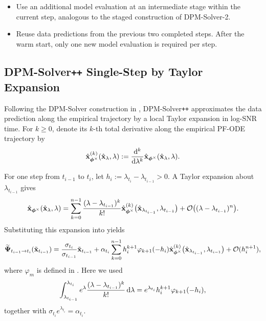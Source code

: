 \begin{itemize}
    \item {}
    Use an additional model evaluation at an intermediate stage within the
    current step, analogous to the staged construction of DPM-Solver-2.

    \item {}
    Reuse data predictions from the previous two completed steps. After the
    warm start, only one new model evaluation is required per step.
\end{itemize}


\subsection{DPM-Solver\texttt{++} Single-Step by Taylor Expansion}
\label{subsec:dpm-solver++-single}

Following the DPM-Solver construction in ,
DPM-Solver\texttt{++} approximates the data prediction along the empirical
trajectory by a local Taylor expansion in log-SNR time. For $k\geq0$, denote
its $k$-th total derivative along the empirical PF-ODE trajectory by
\[
\hat{{\mathbf{x}}}_{\bm{\phi}^\times}^{(k)}
(\hat{{\mathbf{x}}}_\lambda,\lambda)
:=
\frac{\mathop{}\!\mathrm{d}^k}{\mathop{}\!\mathrm{d}\lambda^k}
\hat{{\mathbf{x}}}_{\bm{\phi}^\times}
(\hat{{\mathbf{x}}}_\lambda,\lambda).
\]

For one step from $t_{i-1}$ to $t_i$, let $h_i
:=
\lambda_{t_i}-\lambda_{t_{i-1}}
>0$. A Taylor expansion about $\lambda_{t_{i-1}}$ gives
\[
\hat{{\mathbf{x}}}_{\bm{\phi}^\times}
(\hat{{\mathbf{x}}}_\lambda,\lambda)
=
\sum_{k=0}^{n-1}
\frac{
(\lambda-\lambda_{t_{i-1}})^k
}{
k!
}
\hat{{\mathbf{x}}}_{\bm{\phi}^\times}^{(k)}
\bigl(
\hat{{\mathbf{x}}}_{\lambda_{t_{i-1}}},
\lambda_{t_{i-1}}
\bigr)
+
\mathcal O
\bigl(
(\lambda-\lambda_{t_{i-1}})^n
\bigr).
\]
Substituting this expansion into  yields
\begin{align}
\label{eq:dpmpp-taylor-expansion}
\widetilde{{\bm{\Psi}}}_{t_{i-1}\to t_i}
(\tilde{{\mathbf{x}}}_{t_{i-1}})
=
\frac{\sigma_{t_i}}{\sigma_{t_{i-1}}}
\tilde{{\mathbf{x}}}_{t_{i-1}}
+
\alpha_{t_i}
\sum_{k=0}^{n-1}
h_i^{k+1}
\varphi_{k+1}(-h_i)
\hat{{\mathbf{x}}}_{\bm{\phi}^\times}^{(k)}
\bigl(
\hat{{\mathbf{x}}}_{\lambda_{t_{i-1}}},
\lambda_{t_{i-1}}
\bigr)
+
\mathcal O(h_i^{n+1}),
\end{align}
where $\varphi_m$ is defined in . Here we used
\[
\int_{\lambda_{t_{i-1}}}^{\lambda_{t_i}}
e^\lambda
\frac{
(\lambda-\lambda_{t_{i-1}})^k
}{
k!
}
\mathop{}\!\mathrm{d}\lambda
=
e^{\lambda_{t_i}}
h_i^{k+1}
\varphi_{k+1}(-h_i),
\]
together with
$\sigma_{t_i}e^{\lambda_{t_i}}=\alpha_{t_i}$.

